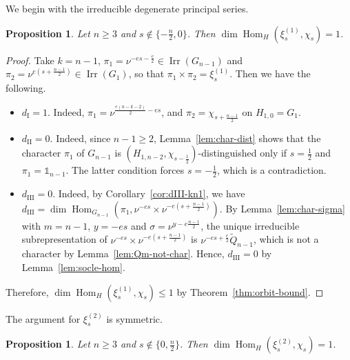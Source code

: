\documentclass[11pt]{amsart}
\numberwithin{equation}{section}
\theoremstyle{plain}
\newtheorem{proposition}[theorem]{Proposition}
\theoremstyle{definition}
\theoremstyle{remark}
\newcommand{\one}{\mathds{1}}
\DeclareMathOperator{\Hom}{Hom}
\DeclareMathOperator{\Irr}{Irr}
\newcommand{\Qt}{\widetilde{Q}}
\newcommand{\xione}{\xi^{(1)}}
\newcommand{\xitwo}{\xi^{(2)}}
\newcommand{\dI}{d_{\mathrm{I}}}
\newcommand{\dII}{d_{\mathrm{II}}}
\newcommand{\dIII}{d_{\mathrm{III}}}
\begin{document}
We begin with the irreducible degenerate principal series.

\begin{proposition}\label{prop:mult-xi1}
	Let $n\ge3$ and $s\notin\{-\frac n2,0\}$. Then $\dim\Hom_H(\xione_s,\chi_s)=1$.
\end{proposition}

\begin{proof}
	Take $k=n-1$, $\pi_1=\nu^{-es-\frac e2}\in\Irr(G_{n-1})$ and $\pi_2=\nu^{e(s+\frac{n-1}2)}\in\Irr(G_1)$, so that $\pi_1\times\pi_2=\xione_s$. Then we have the following.
	\begin{itemize}
		\item $\dI=1$. Indeed, $\pi_1=\nu^{\frac{e(n-k-2)}2-es}$, and $\pi_2=\chi_{s+\frac{n-1}2}$ on $H_{1,0}=G_1$.
		\item $\dII=0$. Indeed, since $n-1\ge2$, Lemma~\ref{lem:char-dist} shows that the character $\pi_1$ of $G_{n-1}$ is $(H_{1,n-2},\chi_{s-\frac12})$-distinguished only if $s=\frac12$ and $\pi_1=\one_{n-1}$. The latter condition forces $s=-\frac12$, which is a contradiction.
		\item $\dIII=0$. Indeed, by Corollary~\ref{cor:dIII-kn1}, we have $\dIII=\dim\Hom_{G_{n-1}}(\pi_1,\nu^{-es}\times\nu^{-e(s+\frac{n-1}2)})$. By Lemma~\ref{lem:char-sigma} with $m=n-1$, $y=-es$ and $\sigma=\nu^{y-e\frac{n-1}2}$, the unique irreducible subrepresentation of $\nu^{-es}\times\nu^{-e(s+\frac{n-1}2)}$ is $\nu^{-es+\frac e2}\Qt_{n-1}$, which is not a character by Lemma~\ref{lem:Qm-not-char}. Hence, $\dIII=0$ by Lemma~\ref{lem:socle-hom}.
	\end{itemize}
	Therefore, $\dim\Hom_H(\xione_s,\chi_s)\le1$ by Theorem~\ref{thm:orbit-bound}.
\end{proof}

The argument for $\xitwo_s$ is symmetric.

\begin{proposition}\label{prop:mult-xi2}
	Let $n\ge3$ and $s\notin\{0,\frac n2\}$. Then $\dim\Hom_H(\xitwo_s,\chi_s)=1$.
\end{proposition}
\end{document}
